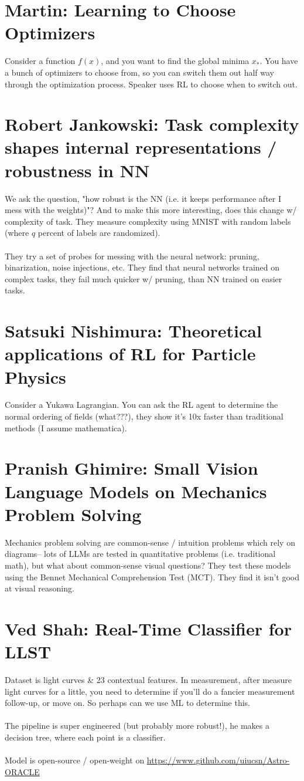 \section{Martin: Learning to Choose Optimizers}
Consider a function $f(x)$, and you want to find the global minima $x_*$. You have a bunch of optimizers to choose from, so you can switch them out half way through the optimization process. Speaker uses RL to choose when to switch out.

\section{Robert Jankowski: Task complexity shapes internal representations / robustness in NN}
We ask the question, "how robust is the NN (i.e. it keeps performance after I mess with the weights)"? And to make this more interesting, does this change w/ complexity of task. They measure complexity using MNIST with random labels (where $q$ percent of labels are randomized).\\
\\
They try a set of probes for messing with the neural network: pruning, binarization, noise injections, etc. They find that neural networks trained on complex tasks, they fail much quicker w/ pruning, than NN trained on easier tasks.

\section{Satsuki Nishimura: Theoretical applications of RL for Particle Physics}
Consider a Yukawa Lagrangian. You can ask the RL agent to determine the normal ordering of fields (what???), they show it's 10x faster than traditional methods (I assume mathematica).

\section{Pranish Ghimire: Small Vision Language Models on Mechanics Problem Solving}
Mechanics problem solving are common-sense / intuition problems which rely on diagrams-- lots of LLMs are tested in quantitative problems (i.e. traditional math), but what about common-sense visual questions? They test these models using the Bennet Mechanical Comprehension Test (MCT). They find it isn't good at visual reasoning.

\section{Ved Shah: Real-Time Classifier for LLST}
Dataset is light curves \& 23 contextual features. In measurement, after measure light curves for a little, you need to determine if you'll do a fancier measurement follow-up, or move on. So perhaps can we use ML to determine this.\\
\\
The pipeline is super engineered (but probably more robust!), he makes a decision tree, where each point is a classifier.\\
\\
Model is open-source / open-weight on \url{https://www.github.com/uiucsn/Astro-ORACLE}


